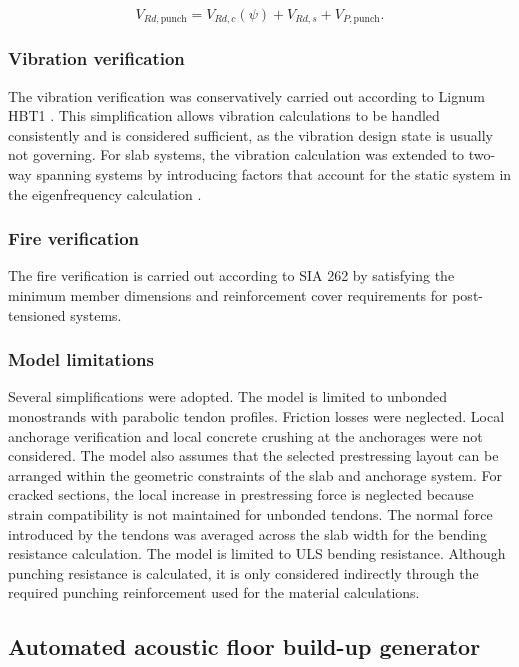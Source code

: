 \begin{equation}
V_{Rd,\mathrm{punch}}
=
V_{Rd,c}(\psi)
+
V_{Rd,s}
+
V_{P,\mathrm{punch}}.
\end{equation}

\subsubsection{Vibration verification}

The vibration verification was conservatively carried out according to Lignum HBT1 \cite{Lignum2021_HBT1}. This simplification allows vibration calculations to be handled consistently and is considered sufficient, as the vibration design state is usually not governing. For slab systems, the vibration calculation was extended to two-way spanning systems by introducing factors that account for the static system in the eigenfrequency calculation \cite{Ziegler2008Grundlagen}.

\subsubsection{Fire verification}
The fire verification is carried out according to SIA 262 \cite{SIA262_2025} by satisfying the minimum member dimensions and reinforcement cover requirements for post-tensioned systems.


\subsubsection{Model limitations}
Several simplifications were adopted. The model is limited to unbonded monostrands with parabolic tendon profiles. Friction losses were neglected. Local anchorage verification and local concrete crushing at the anchorages were not considered. The model also assumes that the selected prestressing layout can be arranged within the geometric constraints of the slab and anchorage system. For cracked sections, the local increase in prestressing force is neglected because strain compatibility is not maintained for unbonded tendons. The normal force introduced by the tendons was averaged across the slab width for the bending resistance calculation. The model is limited to ULS bending resistance. Although punching resistance is calculated, it is only considered indirectly through the required punching reinforcement used for the material calculations.

\newpage
\subsection{Automated acoustic floor build-up generator \label{Sec: AutFloor}}

